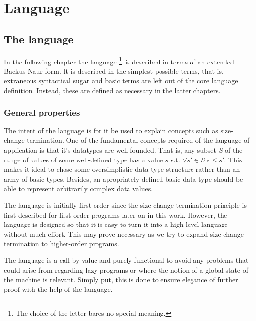 \chapter{Language}

\section{The language }

In the following chapter the language \footnote{The choice of the
letter  bares no special meaning.}\ is described in terms of an
extended Backus-Naur form\footnotemark. It is described in the simplest
possible terms, that is, extraneous syntactical sugar and basic terms are left
out of the core language definition.  Instead, these are defined as necessary
in the latter chapters.


\subsection{General properties}

The intent of the language is for it be used to explain concepts such as
size-change termination. One of the fundamental concepts required of the
language of application is that it's datatypes are well-founded. That is, any
subset $S$ of the range of values of some well-defined type has a value $s$
s.t. $\forall {s'\in S}\ s\leq s'$. This makes it ideal to chose some
oversimplistic data type structure rather than an army of basic types. Besides,
an apropriately defined basic data type should be able to represent arbitrarily
complex data values.

The language is initially first-order since the size-change termination
principle is first described for first-order programs later on in this work.
However, the language is designed so that it is easy to turn it into a
high-level language without much effort. This may prove necessary as we try to
expand size-change termination to higher-order programs.

The language is a call-by-value and purely functional to avoid any problems
that could arise from regarding lazy programs or where the notion of a global
state of the machine is relevant. Simply put, this is done to ensure elegance
of further proof with the help of the language.



